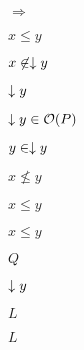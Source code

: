\documentclass[10pt]{book}
\begin{document}
\begin{mdSnippets}
\begin{mdInlineSnippet}[055889aaee38b7c53f994c5e42a40994]%
$\Rightarrow$\end{mdInlineSnippet}%
\begin{mdInlineSnippet}[a06b941ca6029ffd3ef8c0653b7e280e]%
$x \leq y$\end{mdInlineSnippet}%
\begin{mdInlineSnippet}%
$x \not\in \downarrow y$\end{mdInlineSnippet}%
\begin{mdInlineSnippet}[195a4d8e63e86601dc4ee747bc3becbd]%
$\downarrow y$\end{mdInlineSnippet}%
\begin{mdInlineSnippet}[5d75e240b156721e8823c12fcd1b285d]%
$\downarrow y \in \mathcal{O}(P)$\end{mdInlineSnippet}%
\begin{mdInlineSnippet}[e5db8b0a4cd5f0b17d23869616c6e902]%
$y \in \downarrow y$\end{mdInlineSnippet}%
\begin{mdInlineSnippet}%
$x \nleq y$\end{mdInlineSnippet}%
\begin{mdInlineSnippet}[a06b941ca6029ffd3ef8c0653b7e280e]%
$x \leq y$\end{mdInlineSnippet}%
\begin{mdInlineSnippet}[a06b941ca6029ffd3ef8c0653b7e280e]%
$x \leq y$\end{mdInlineSnippet}%
\begin{mdInlineSnippet}[f09564c9ca56850d4cd6b3319e541aee]%
$Q$\end{mdInlineSnippet}%
\begin{mdInlineSnippet}[195a4d8e63e86601dc4ee747bc3becbd]%
$\downarrow y$\end{mdInlineSnippet}%
\begin{mdInlineSnippet}%
$L$\end{mdInlineSnippet}%
\begin{mdInlineSnippet}%
$L$\end{mdInlineSnippet}%

\end{mdSnippets}
\end{document}
